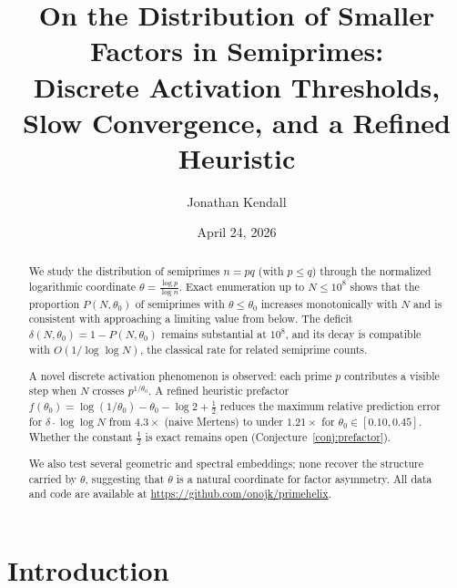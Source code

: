 \documentclass[11pt]{article}
\title{
  \textbf{On the Distribution of Smaller Factors in Semiprimes:}\\[4pt]
  \large Discrete Activation Thresholds, Slow Convergence, and a Refined Heuristic
}
\author{Jonathan Kendall}
\date{April 24, 2026}
\theoremstyle{definition}
\begin{document}
\maketitle

\begin{abstract}
We study the distribution of semiprimes \(n = pq\) (with \(p \leq q\)) through the
normalized logarithmic coordinate \(\theta = \frac{\log p}{\log n}\).
Exact enumeration up to \(N \leq 10^8\) shows that the proportion \(P(N,\theta_0)\)
of semiprimes with \(\theta \leq \theta_0\) increases monotonically with \(N\) and is
consistent with approaching a limiting value from below.  The deficit
\(\delta(N,\theta_0) = 1 - P(N,\theta_0)\) remains substantial at \(10^8\),
and its decay is compatible with \(O(1/\!\log\log N)\), the classical rate for
related semiprime counts.

A novel discrete activation phenomenon is observed: each prime \(p\) contributes a
visible step when \(N\) crosses \(p^{1/\theta_0}\).  A refined heuristic prefactor
\(f(\theta_0) = \log(1/\theta_0) - \theta_0 - \log 2 + \tfrac{1}{2}\) reduces the
maximum relative prediction error for \(\delta\cdot\log\log N\) from \(4.3\times\)
(naive Mertens) to under \(1.21\times\) for \(\theta_0\in[0.10,0.45]\).
Whether the constant \(\tfrac{1}{2}\) is exact remains open (Conjecture~\ref{conj:prefactor}).

We also test several geometric and spectral embeddings; none recover the structure
carried by \(\theta\), suggesting that \(\theta\) is a natural coordinate for
factor asymmetry.  All data and code are available at
\url{https://github.com/onojk/primehelix}.
\end{abstract}

\section{Introduction}
\end{document}

